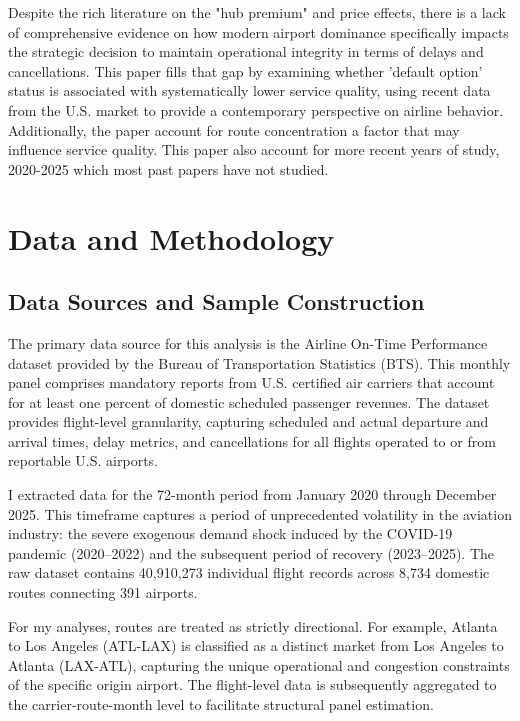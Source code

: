 \documentclass[preprint,12pt,authoryear]{elsarticle}
\begin{document}
Despite the rich literature on the "hub premium" and price effects, there is a lack of comprehensive evidence on how modern airport dominance specifically impacts the strategic decision to maintain operational integrity in terms of delays and cancellations. This paper fills that gap by examining whether 'default option' status is associated with systematically lower service quality, using recent data from the U.S. market to provide a contemporary perspective on airline behavior. Additionally, the paper account for route concentration a factor that may influence service quality. This paper also account for more recent years of study, 2020-2025 which most past papers have not studied.

\section{Data and Methodology}
\label{sec:methodology}

\subsection{Data Sources and Sample Construction}
The primary data source for this analysis is the Airline On-Time Performance dataset provided by the Bureau of Transportation Statistics (BTS). This monthly panel comprises mandatory reports from U.S. certified air carriers that account for at least one percent of domestic scheduled passenger revenues. The dataset provides flight-level granularity, capturing scheduled and actual departure and arrival times, delay metrics, and cancellations for all flights operated to or from reportable U.S. airports.

I extracted data for the 72-month period from January 2020 through December 2025. This timeframe captures a period of unprecedented volatility in the aviation industry: the severe exogenous demand shock induced by the COVID-19 pandemic (2020–2022) and the subsequent period of recovery (2023–2025). The raw dataset contains 40,910,273 individual flight records across 8,734 domestic routes connecting 391 airports.

For my analyses, routes are treated as strictly directional. For example, Atlanta to Los Angeles (ATL-LAX) is classified as a distinct market from Los Angeles to Atlanta (LAX-ATL), capturing the unique operational and congestion constraints of the specific origin airport. The flight-level data is subsequently aggregated to the carrier-route-month level to facilitate structural panel estimation.
\end{document}
